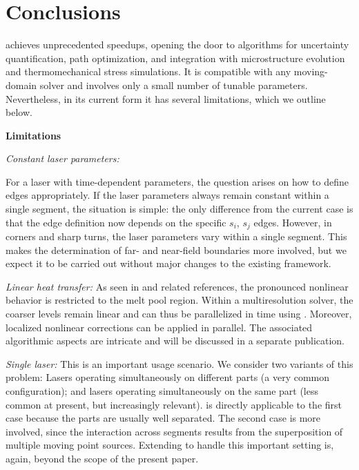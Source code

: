 \documentclass[conference]{IEEEtran}
\begin{document}
\section{Conclusions}\label{seq:conclusions}
\method achieves unprecedented speedups, opening the door to algorithms for uncertainty quantification, path optimization, and integration with microstructure evolution and thermomechanical stress simulations.  
It is compatible with any moving-domain solver and involves only a small number of tunable parameters.  
Nevertheless, in its current form it has several limitations, which we outline below.


{\bf Limitations}
\begin{itemize*}

\item \emph{Constant laser parameters:}

For a laser with time-dependent parameters,  the question arises on how to define edges appropriately. 
If the laser parameters always remain constant within a single segment, the situation is simple:
the only difference from the current case is that the edge definition now depends on the specific $s_i$, $s_j$ edges. 
However, in corners and sharp turns, the laser parameters vary within a single segment.
This makes the determination of far- and near-field boundaries more involved, but we expect it to be carried out without major changes to the existing framework.

\item \emph{Linear heat transfer:}
As seen in \cite{leonor2024go, aydin2026hermes} and related references, the pronounced nonlinear behavior is restricted to the melt pool region. 
Within a multiresolution solver, the coarser levels remain linear and can thus be parallelized in time using \method. 
Moreover, localized nonlinear corrections can be applied in parallel. 
The associated algorithmic aspects are intricate and will be discussed in a separate publication.

\item \emph{Single laser:}
This is an important usage scenario. 
We consider two variants of this problem: 
Lasers operating simultaneously on different parts (a very common configuration);
and lasers operating simultaneously on the same part (less common at present, but increasingly relevant). 
\method is directly applicable to the first case because the parts are usually well separated. 
The second case is more involved, since the interaction across segments results from the superposition of multiple moving point sources. 
Extending \method to handle this important setting is, again, beyond the scope of the present paper.


\end{itemize*}
\end{document}
